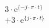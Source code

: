 \[
\begin{split}
&  3 \cdot \textrm{e}^{\{- j \cdot \pi \cdot t \}}\\
&+ 3 \cdot \textrm{e}^{\{  j \cdot \pi \cdot t \}}
\end{split}
\]

